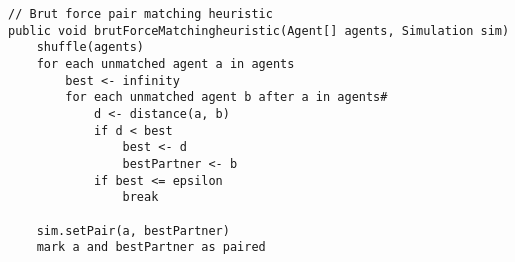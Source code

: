 \begin{lstlisting}
// Brut force pair matching heuristic
public void brutForceMatchingheuristic(Agent[] agents, Simulation sim) 
	shuffle(agents)
	for each unmatched agent a in agents
		best <- infinity
		for each unmatched agent b after a in agents#
			d <- distance(a, b)			
			if d < best
				best <- d
				bestPartner <- b
			if best <= epsilon
				break			
						
	sim.setPair(a, bestPartner)
	mark a and bestPartner as paired		
	
\end{lstlisting}